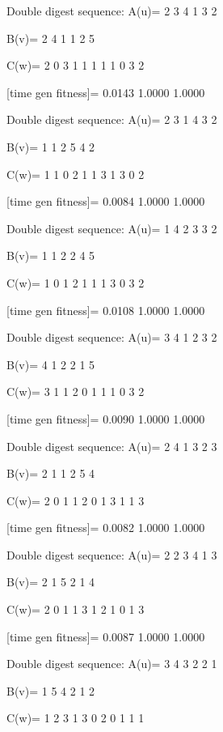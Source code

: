Double digest sequence:
A(u)=
     2     3     4     1     3     2

B(v)=
     2     4     1     1     2     5

C(w)=
     2     0     3     1     1     1     1     1     0     3     2

[time gen fitness]=
    0.0143    1.0000    1.0000

Double digest sequence:
A(u)=
     2     3     1     4     3     2

B(v)=
     1     1     2     5     4     2

C(w)=
     1     1     0     2     1     1     3     1     3     0     2

[time gen fitness]=
    0.0084    1.0000    1.0000

Double digest sequence:
A(u)=
     1     4     2     3     3     2

B(v)=
     1     1     2     2     4     5

C(w)=
     1     0     1     2     1     1     1     3     0     3     2

[time gen fitness]=
    0.0108    1.0000    1.0000

Double digest sequence:
A(u)=
     3     4     1     2     3     2

B(v)=
     4     1     2     2     1     5

C(w)=
     3     1     1     2     0     1     1     1     0     3     2

[time gen fitness]=
    0.0090    1.0000    1.0000

Double digest sequence:
A(u)=
     2     4     1     3     2     3

B(v)=
     2     1     1     2     5     4

C(w)=
     2     0     1     1     2     0     1     3     1     1     3

[time gen fitness]=
    0.0082    1.0000    1.0000

Double digest sequence:
A(u)=
     2     2     3     4     1     3

B(v)=
     2     1     5     2     1     4

C(w)=
     2     0     1     1     3     1     2     1     0     1     3

[time gen fitness]=
    0.0087    1.0000    1.0000

Double digest sequence:
A(u)=
     3     4     3     2     2     1

B(v)=
     1     5     4     2     1     2

C(w)=
     1     2     3     1     3     0     2     0     1     1     1

